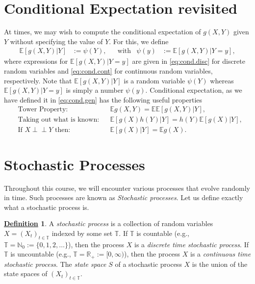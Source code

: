 \documentclass[12pt]{book}
\numberwithin{equation}{chapter}
\theoremstyle{plain}
\numberwithin{theorem}{section}
\theoremstyle{definition}
\newtheorem{definition}[theorem]{\underline{Definition}}
\numberwithin{exercise}{chapter}
\newcommand{\<}{\langle}
\renewcommand{\>}{\rangle}
\renewcommand{\(}{\left(}
\renewcommand{\)}{\right)}
\renewcommand{\[}{\left[}
\renewcommand{\]}{\right]}
\newcommand\Eb{\mathds{E}}
\newcommand\Rb{\mathds{R}}
\newcommand\Nb{\mathds{N}}
\newcommand{\ind}{\perp \! \! \! \perp}
\theoremstyle{definition}
\numberwithin{question}{section}
\begin{document}
\section{Conditional Expectation revisited}
\label{sec:expect}
At times, we may wish to compute the conditional expectation of $g(X,Y)$ given $Y$ without specifying the value of $Y$.  For this, we define
\begin{align}
\Eb[ g(X,Y) | Y ]
	&:=	\psi(Y) , &
	&\text{with}&
\psi(y)
	&:=	\Eb[ g(X, Y) | Y = y ] , \label{eq:cond.gen}
\end{align}
where expressions for $\Eb[ g(X, Y) | Y = y ]$ are given in \eqref{eq:cond.disc} for discrete random variables and \eqref{eq:cond.cont} for continuous random variables, respectively.  Note that $\Eb[ g(X,Y) | Y ]$ is a random variable $\psi(Y)$ whereas $\Eb[ g(X, Y) | Y = y ]$ is simply a number $\psi(y)$.  Conditional expectation, as we have defined it in \eqref{eq:cond.gen} has the following useful properties
\begin{align}
&\text{Tower Property}:&&
\Eb g(X,Y)
	 =	\Eb \Eb[ g(X,Y) | Y ] , \label{eq:tower} \\
&\text{Taking out what is known}:&&
\Eb[ g(X) h(Y) | Y ]
	 =	 h(Y) \Eb[ g(X) | Y ] , \label{eq:known} \\
&\text{If $X \ind Y$ then}: &&
\Eb[ g(X) | Y ]
	 =	\Eb g(X) . \label{eq:E.ind}
\end{align}


\section{Stochastic Processes}

Throughout this course, we will encounter various processes that evolve randomly in time.  Such processes are known as \textit{Stochastic processes}.  Let us define exactly what a stochastic process is.

\begin{definition}
A \textit{stochastic process} is a collection of random variables $X = (X_t)_{t \in \mathds{T}}$ indexed by some set $\mathds{T}$. 
If $\mathds{T}$ is countable (e.g., $\mathds{T} = \Nb_0 := \{0, 1, 2, \ldots \}$), then the process $X$ is a \textit{discrete time stochastic process}. 
If $\mathds{T}$ is uncountable (e.g., $\mathds{T} = \Rb_+ := [0, \infty)$), then the process $X$ is a \textit{continuous time stochastic process}.
The \textit{state space} $S$ of a stochastic process $X$ is the union of the state spaces of $(X_t)_{t \in \mathds{T}}$.
\end{definition}
\end{document}
